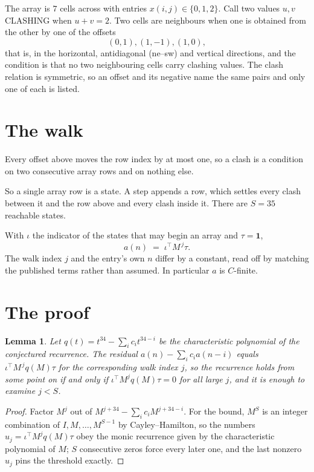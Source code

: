 \documentclass[11pt,a4paper]{article}
\theoremstyle{plain}
\newtheorem{lemma}[theorem]{Lemma}
\theoremstyle{definition}
\begin{document}
The array is $7$ cells across with entries $x(i,j)\in\{0,1,2\}$. Call two values $u,v$ CLASHING
when $u+v=2$. Two cells are neighbours when one is obtained from the other by one of
the offsets
\[
(0,1), (1,-1), (1,0),
\]
that is, in the horizontal, antidiagonal (ne--sw) and vertical directions, and the condition is that no two neighbouring cells carry
clashing values. The clash relation is symmetric, so an offset and its negative name the
same pairs and only one of each is listed.

\section{The walk}

Every offset above moves the row index by at most one, so a clash is a condition on two
consecutive array rows and on nothing else.

So a single array row is a state. A step appends a row, which settles every clash between it
and the row above and every clash inside it. There are $S=35$ reachable states.

With $\iota$ the indicator of the states that may begin an array and $\tau=\mathbf{1}$,
\[
a(n)\;=\;\iota^{\!\top}M^{\,j}\tau .
\]
The walk index $j$ and the entry's own $n$ differ by a constant, read off by matching the
published terms rather than assumed. In particular $a$ is $C$-finite.

\section{The proof}

\begin{lemma}\label{lem:crit}
Let $q(t)=t^{34}-\sum_i c_it^{34-i}$ be the characteristic polynomial of the
conjectured recurrence. The residual $a(n)-\sum_ic_ia(n-i)$ equals
$\iota^{\!\top}M^{\,j}q(M)\tau$ for the corresponding walk index $j$, so the recurrence
holds from some point on if and only if $\iota^{\!\top}M^{j}q(M)\tau=0$ for all large $j$,
and it is enough to examine $j<S$.
\end{lemma}

\begin{proof}
Factor $M^{j}$ out of $M^{j+34}-\sum_ic_iM^{j+34-i}$. For the bound, $M^{S}$
is an integer combination of $I,M,\dots,M^{S-1}$ by Cayley--Hamilton, so the numbers
$u_j=\iota^{\!\top}M^{j}q(M)\tau$ obey the monic recurrence given by the characteristic
polynomial of $M$; $S$ consecutive zeros force every later one, and the last nonzero $u_j$
pins the threshold exactly.
\end{proof}
\end{document}
